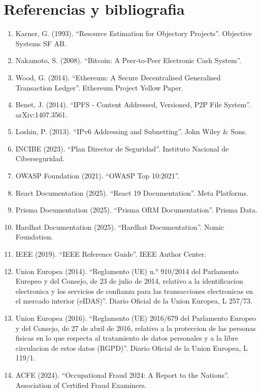 \documentclass[11pt, a4paper]{article}
\begin{document}
\section{Referencias y bibliografia}

\begin{enumerate}
    \item Karner, G. (1993). ``Resource Estimation for Objectory Projects''. Objective Systems SF AB.
    \item Nakamoto, S. (2008). ``Bitcoin: A Peer-to-Peer Electronic Cash System''.
    \item Wood, G. (2014). ``Ethereum: A Secure Decentralised Generalised Transaction Ledger''. Ethereum Project Yellow Paper.
    \item Benet, J. (2014). ``IPFS - Content Addressed, Versioned, P2P File System''. arXiv:1407.3561.
    \item Loshin, P. (2013). ``IPv6 Addressing and Subnetting''. John Wiley \& Sons.
    \item INCIBE (2023). ``Plan Director de Seguridad''. Instituto Nacional de Ciberseguridad.
    \item OWASP Foundation (2021). ``OWASP Top 10:2021''.
    \item React Documentation (2025). ``React 19 Documentation''. Meta Platforms.
    \item Prisma Documentation (2025). ``Prisma ORM Documentation''. Prisma Data.
    \item Hardhat Documentation (2025). ``Hardhat Documentation''. Nomic Foundation.
    \item IEEE (2019). ``IEEE Reference Guide''. IEEE Author Center.
    \item Union Europea (2014). ``Reglamento (UE) n.° 910/2014 del Parlamento Europeo y del Consejo, de 23 de julio de 2014, relativo a la identificacion electronica y los servicios de confianza para las transacciones electronicas en el mercado interior (eIDAS)''. Diario Oficial de la Union Europea, L 257/73.
    \item Union Europea (2016). ``Reglamento (UE) 2016/679 del Parlamento Europeo y del Consejo, de 27 de abril de 2016, relativo a la proteccion de las personas fisicas en lo que respecta al tratamiento de datos personales y a la libre circulacion de estos datos (RGPD)''. Diario Oficial de la Union Europea, L 119/1.
    \item ACFE (2024). ``Occupational Fraud 2024: A Report to the Nations''. Association of Certified Fraud Examiners.

\end{enumerate}
\end{document}
